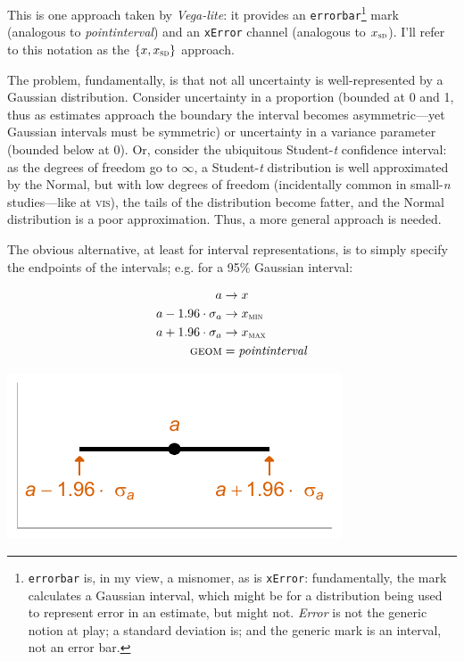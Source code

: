 \documentclass[journal]{vgtc}                     %
\begin{document}
This is one approach taken by \textit{Vega-lite}: it provides an \texttt{errorbar}\footnote{\texttt{errorbar} is, in my view, a misnomer, as is \texttt{xError}: fundamentally, the mark calculates a Gaussian interval, which might be for a distribution being used to represent error in an estimate, but might not. \textit{Error} is not the generic notion at play; a standard deviation is; and the generic mark is an interval, not an error bar.} mark (analogous to \textit{pointinterval}) and an \texttt{xError}  channel (analogous to $x_\textsc{sd}$). I'll refer to this notation as the $\{x, x_\textsc{sd}\}$ approach.

The problem, fundamentally, is that not all uncertainty is well-represented by a Gaussian distribution. Consider uncertainty in a proportion (bounded at 0 and 1, thus as estimates approach the boundary the interval becomes asymmetric---yet Gaussian intervals must be symmetric) or uncertainty in a variance parameter (bounded below at 0). Or, consider the ubiquitous Student-\textit{t} confidence interval: as the degrees of freedom go to $\infty$, a Student-\textit{t} distribution is well approximated by the Normal, but with low degrees of freedom (incidentally common in small-\textit{n} studies---like at \textsc{vis}), the tails of the distribution become fatter, and the Normal distribution is a poor approximation. Thus, a more general approach is needed.

The obvious alternative, at least for interval representations, is to simply specify the endpoints of the intervals; e.g. for a 95\% Gaussian interval:

  \begin{minipage}{.5\columnwidth}
\begin{align*}
a &\rightarrow x\\
a - 1.96 \cdot \sigma_a &\rightarrow x_\textsc{min}\\
a + 1.96 \cdot \sigma_a &\rightarrow x_\textsc{max}\\
\textsc{geom} &= \mathit{pointinterval}
\end{align*}
  \end{minipage}%
  \begin{minipage}{.4\columnwidth}
    \centering
    \includegraphics[width=1.2\columnwidth]{figs/2-xmin_xmax_interval.pdf}
  \end{minipage}
\hfill\break
\end{document}
